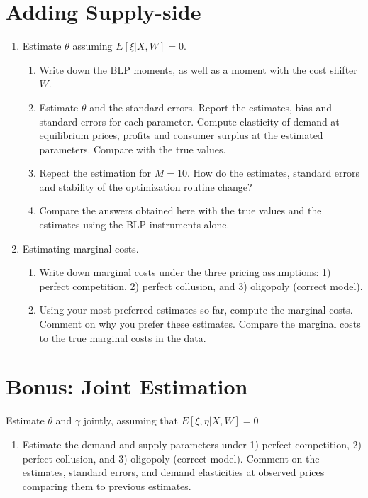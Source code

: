 \documentclass[12pt ]{article}
\begin{document}
\section{Adding Supply-side}

\begin{enumerate}
\item Estimate $\theta$ assuming $E[\xi|X,W]=0$.
  \begin{enumerate}
  \item Write down the BLP moments, as well as a moment with the cost shifter $W$.
  \item Estimate $\theta$ and the standard errors. Report the
    estimates, bias and standard errors for each parameter. Compute
    elasticity of demand at equilibrium prices, profits and consumer
    surplus at the estimated parameters. Compare with the true values.
  \item Repeat the estimation for $M=10$. How do the estimates,
    standard errors and stability of the optimization routine change?
  \item Compare the answers obtained here with the true values and the
    estimates using the BLP instruments alone.
  \end{enumerate}

\item Estimating marginal costs.
  \begin{enumerate}
  \item Write down marginal costs under the three pricing assumptions:
    1) perfect competition, 2) perfect collusion, and 3) oligopoly
    (correct model).
  \item Using your most preferred estimates so far, compute the
    marginal costs. Comment on why you prefer these estimates. Compare
    the marginal costs to the true marginal costs in the data.
  \end{enumerate}
\end{enumerate}

\section{Bonus: Joint Estimation}

Estimate $\theta$ and $\gamma$ jointly, assuming that
  $E[\xi,\eta|X,W]=0$
  
\begin{enumerate}
  \item Estimate the demand and supply parameters under 1) perfect competition, 2) perfect collusion, and 3) oligopoly (correct model). Comment on the estimates, standard errors, and demand elasticities at observed prices comparing them to previous estimates.
\end{enumerate}
\end{document}

